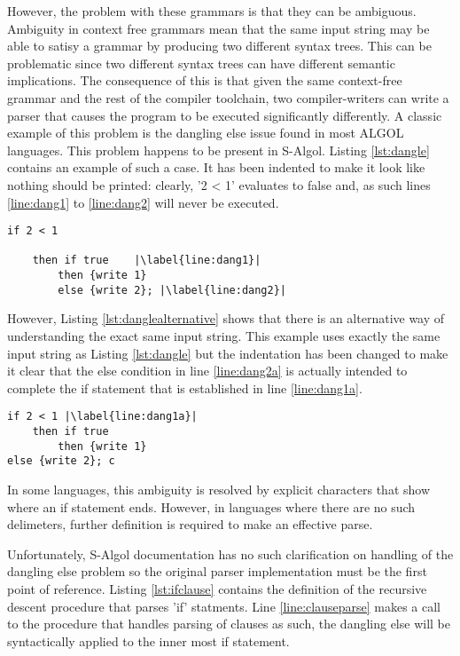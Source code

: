\documentclass{article}
\begin{document}
However, the problem with these grammars is that they can be ambiguous. Ambiguity in context free grammars mean that the same input string may be able to satisy a grammar by producing two different syntax trees. This can be problematic since two different syntax trees can have different semantic implications. The consequence of this is that given the same context-free grammar and the rest of the compiler toolchain, two compiler-writers can write a parser that causes the program to be executed significantly differently. A classic example of this problem is the dangling else issue found in most ALGOL languages. This problem happens to be present in S-Algol. Listing \ref{lst:dangle} contains an example of such a case. It has been indented to make it look like nothing should be printed: clearly, '2 < 1' evaluates to false and, as such lines \ref{line:dang1} to \ref{line:dang2} will never be executed.

\begin{lstlisting}[caption={S-Algol dangling else},label={lst:dangle}, escapechar="|"]
if 2 < 1

	then if true	|\label{line:dang1}|
		then {write 1}
		else {write 2}; |\label{line:dang2}|
\end{lstlisting}

However, Listing \ref{lst:danglealternative} shows that there is an alternative way of understanding the exact same input string. This example uses exactly the same input string as Listing \ref{lst:dangle} but the indentation has been changed to make it clear that the else condition in line \ref{line:dang2a} is actually intended to complete the if statement that is established in line \ref{line:dang1a}.

\begin{lstlisting}[caption={S-Algol dangling else alternative parse},label={lst:danglealternative}, escapechar="|"]
if 2 < 1 |\label{line:dang1a}|
	then if true 
		then {write 1}
else {write 2}; c
\end{lstlisting}

In some languages, this ambiguity is resolved by explicit characters that show where an if statement ends. However, in languages where there are no such delimeters, further definition is required to make an effective parse.

Unfortunately, S-Algol documentation has no such clarification on handling of the dangling else problem so the original parser implementation must be the first point of reference. Listing \ref{lst:ifclause} contains the definition of the recursive descent procedure that parses 'if' statments. Line \ref{line:clauseparse} makes a call to the procedure that handles parsing of clauses as such, the dangling else will be syntactically applied to the inner most if statement.
\end{document}
